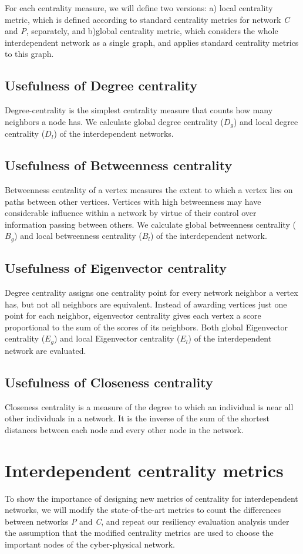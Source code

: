 \documentclass[letterpaper, 10 pt, conference]{ieeeconf}  %
\begin{document}
For each centrality measure, we will define two versions: a) local centrality metric, which is defined according to standard centrality metrics for network \textit{C} and \textit{P}, separately, and b)global centrality metric, which considers the whole interdependent network as a single graph, and applies standard centrality metrics to this graph.
\subsection{Usefulness of Degree centrality} Degree-centrality is the simplest centrality measure that counts how many neighbors a node has. We calculate global degree centrality ($D_g$) and local degree centrality ($D_l$) of the interdependent networks.
\subsection{Usefulness of Betweenness centrality} Betweenness centrality of a vertex measures the extent to which a vertex lies on paths between other vertices. Vertices with high betweenness may have considerable influence within a network by virtue of their control over information passing between others. We calculate global betweenness centrality ($B_g$) and local betweenness centrality ($B_l$) of the interdependent network.
\subsection{Usefulness of Eigenvector centrality} Degree centrality assigns one centrality point for every network neighbor a vertex has, but not all neighbors are equivalent. Instead of awarding vertices just one point for each neighbor, eigenvector centrality gives each vertex a score proportional to the sum of the scores of its neighbors. Both global Eigenvector centrality ($E_g$) and local Eigenvector centrality ($E_l$) of the interdependent network are evaluated.
\subsection{Usefulness of Closeness centrality} Closeness centrality is a measure of the degree to which an individual is near all other individuals in a network. It is the inverse of the sum of the shortest distances between each node and every other node in the network.

\section{Interdependent centrality metrics}
To show the importance of designing new metrics of centrality for interdependent networks, we will modify the state-of-the-art metrics to count the differences between networks \textit{P} and \textit{C}, and repeat our resiliency evaluation analysis under the assumption that the modified centrality metrics are used to choose the important nodes of the cyber-physical network.
\end{document}
